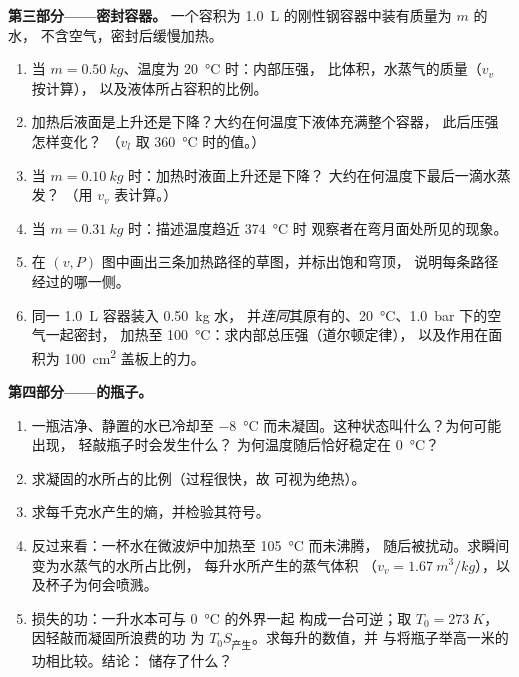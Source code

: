 \begin{problem}
\medskip
\noindent\textbf{第三部分——密封容器。}
一个容积为 \qty{1.0}{L} 的刚性钢容器中装有质量为 $m$ 的水，
不含空气，密封后缓慢加热。
\begin{enumerate}[resume]
  \item 当 $m = \qty{0.50}{kg}$、温度为 \qty{20}{\degreeCelsius} 时：内部压强，
        比体积，水蒸气的质量（$v_v$ 按计算），
        以及液体所占容积的比例。
  \item 加热后液面是上升还是下降？大约在何温度下液体充满整个容器，
        此后压强怎样变化？
        （$v_l$ 取 \qty{360}{\degreeCelsius} 时的值。）
  \item 当 $m = \qty{0.10}{kg}$ 时：加热时液面上升还是下降？
        大约在何温度下最后一滴水蒸发？
        （用 $v_v$ 表计算。）
  \item 当 $m = \qty{0.31}{kg}$ 时：描述温度趋近 \qty{374}{\degreeCelsius} 时
        观察者在弯月面处所见的现象。
  \item 在 $(v, P)$ 图中画出三条加热路径的草图，并标出饱和穹顶，
        说明每条路径
        经过的哪一侧。
  \item 同一 \qty{1.0}{L} 容器装入 \qty{0.50}{kg} 水，
        并\emph{连同}其原有的、\qty{20}{\degreeCelsius}、\qty{1.0}{bar} 下的空气一起密封，
        加热至 \qty{100}{\degreeCelsius}：求内部总压强（道尔顿定律），
        以及作用在面积为 \qty{100}{cm^2} 盖板上的力。
\end{enumerate}

\medskip
\noindent\textbf{第四部分——的瓶子。}
\begin{enumerate}[resume]
  \item 一瓶洁净、静置的水已冷却至 \qty{-8}{\degreeCelsius}
        而未凝固。这种状态叫什么？为何可能出现，
        轻敲瓶子时会发生什么？
        为何温度随后恰好稳定在 \qty{0}{\degreeCelsius}？
  \item 求凝固的水所占的比例（过程很快，故
        可视为绝热）。
  \item 求每千克水产生的熵，并检验其符号。
  \item 反过来看：一杯水在微波炉中加热至 \qty{105}{\degreeCelsius} 而未沸腾，
        随后被扰动。求瞬间变为水蒸气的水所占比例，
        每升水所产生的蒸气体积
        （$v_v = \qty{1.67}{m^3/kg}$），以及杯子为何会喷溅。
  \item 损失的功：一升水本可与 \qty{0}{\degreeCelsius} 的外界一起
        构成一台可逆；取
        $T_0 = \qty{273}{K}$，因轻敲而凝固所浪费的功
        为 $T_0S_{\text{产生}}$。求每升的数值，并
        与将瓶子举高一米的功相比较。结论：
        储存了什么？
\end{enumerate}
\end{problem}
